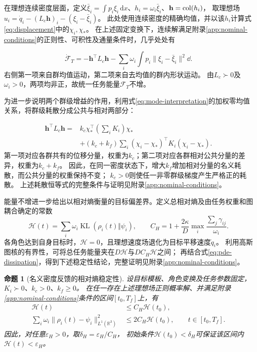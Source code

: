 \documentclass[UTF8,a4paper,11pt,fontset=none]{ctexart}
\newcommand{\R}{\mathbb R}\newcommand{\KL}{\operatorname{KL}}
\newtheorem{proposition}{命题}\newtheorem{lemma}{引理}
\begin{document}
在理想连续密度层面，定义$\bar\xi_i=\int p_i\xi_i\,\mathrm dx$、$h_i=\omega_i\bar\xi_i$、$\mathbf h=\operatorname{col}(h_i)$，
取理想场$u_i=\dot q_i-(L_c\mathbf h)_i-(\xi_i-\bar\xi_i)$。
此处使用连续密度的精确均值，并以该$h_i$计算式\eqref{eq:displacement}中的$\chi_i,\chi_*$。
在上述固定变换下，连续解满足附录\ref{app:nominal-conditions}的正则性、可积性及通量条件时，几乎处处有

\begin{equation}
\dot{\mathcal F}_T=-\mathbf h^\top L_c\mathbf h
-\sum_i\omega_i\int p_i\|\xi_i-\bar\xi_i\|^2\dd .
\label{eq:pde-dissipation}
\end{equation}
右侧第一项来自群均值运动，第二项来自去均值的群内形状运动。
由$L_c\succ0$及$\omega_i>0$，两项均非正，故统一任务能量$\mathcal F_T$不增。

为进一步说明两个群级增益的作用，利用式\eqref{eq:mode-interpretation}的加权零均值关系，将群级耗散分成公共与相对两部分：

\begin{equation}
\begin{aligned}
\mathbf h^\top L_c\mathbf h
={}&k_c\chi_*^\top\left(\sum_iK_i\right)\chi_*\\
&+(k_c+k_f)\sum_i(\chi_i-\chi_*)^\top K_i(\chi_i-\chi_*).
\end{aligned}
\label{eq:positive-mean}
\end{equation}
第一项对应各群共有的位移分量，权重为$k_c$；第二项对应各群相对公共分量的差异，权重为$k_c+k_f$。
因此，在同一密度状态下，增大$k_f$增加相对分量的名义耗散，而公共分量的权重保持不变；
$k_c>0$则使任一非零群级梯度产生严格正的耗散。
上述耗散恒等式的完整条件与证明见附录\ref{app:nominal-conditions}。

能量不增进一步给出以相对熵衡量的目标偏差界。定义总相对熵及由任务权重和图耦合确定的常数
\[
\mathcal H(t)=\sum_i\omega_i\KL(\rho_i(t)\Vert\psi_i),\qquad
C_H=1+\frac{2\kappa}{D}\max_i\frac{\sum_j\gamma_{ij}}{\omega_i}.
\]
各角色达到自身目标时，$\mathcal H=0$，且理想速度场退化为目标平移速度$\dot q_i$。
利用高斯图核的有界性，可将总任务能量夹在$D\mathcal H$与$DC_H\mathcal H$之间；
再结合式\eqref{eq:pde-dissipation}，得到下述稳定性结论，完整证明见附录\ref{app:nominal-conditions}。

\begin{proposition}[名义密度反馈的相对熵稳定性]\label{prop:entropy-stability}
设目标模板、角色变换及任务参数固定，$K_i\succ0$、$k_c>0$、$k_f\ge0$。
在任一存在上述理想场正则概率解、并满足附录\ref{app:nominal-conditions}条件的区间$[t_0,T_f]$上，有
\begin{equation}
\begin{aligned}
\mathcal H(t)&\le C_H\mathcal H(t_0),\\
\sum_i\omega_i\|\rho_i(t)-\psi_i\|_{L^1(\R^3)}^2
&\le 2C_H\mathcal H(t_0),\qquad t\in[t_0,T_f].
\end{aligned}
\label{eq:entropy-stability}
\end{equation}
因此，对任意$\varepsilon_H>0$，取$\delta_H=\varepsilon_H/C_H$，
初始条件$\mathcal H(t_0)<\delta_H$可保证该区间内$\mathcal H(t)<\varepsilon_H$。
\end{proposition}
\end{document}
